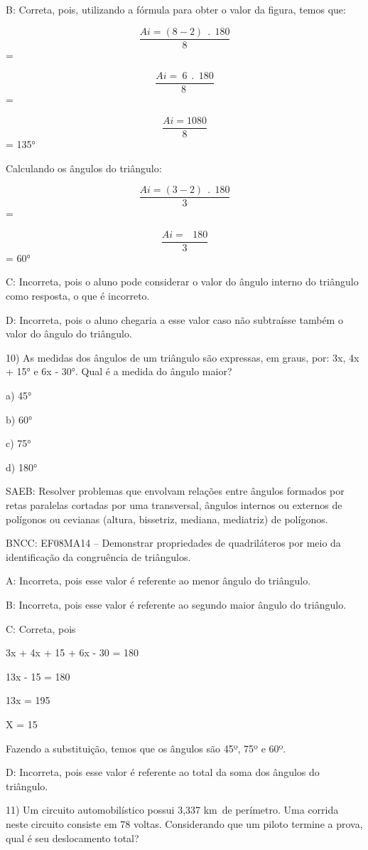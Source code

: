 B: Correta, pois, utilizando a fórmula para obter o valor da figura,
temos que:

\[\frac{Ai = \left( 8 - 2 \right)\ \ .\ \ 180}{8}\] =

\[\frac{Ai = \ 6\ \ .\ \ 180}{8\ }\] =

\[\frac{Ai = 1080}{8}\] = 135°

Calculando os ângulos do triângulo:

\[\frac{Ai = \left( 3 - 2 \right)\ \ .\ \ 180}{3}\] =

\[\frac{Ai = \ \ \ 180}{3}\] = 60°

C: Incorreta, pois o aluno pode considerar o valor do ângulo interno do
triângulo como resposta, o que é incorreto.

D: Incorreta, pois o aluno chegaria a esse valor caso não subtraísse
também o valor do ângulo do triângulo.

10) As medidas dos ângulos de um triângulo são expressas, em graus, por:
3x, 4x + 15° e 6x - 30°. Qual é a medida do ângulo maior?

a) 45°

b) 60°

c) 75°

d) 180°

SAEB: Resolver problemas que envolvam relações entre ângulos formados
por retas paralelas cortadas por uma transversal, ângulos internos ou
externos de polígonos ou cevianas (altura, bissetriz, mediana,
mediatriz) de polígonos.

BNCC: EF08MA14 -- Demonstrar propriedades de quadriláteros por meio da
identificação da congruência de triângulos.

A: Incorreta, pois esse valor é referente ao menor ângulo do triângulo.

B: Incorreta, pois esse valor é referente ao segundo maior ângulo do
triângulo.

C: Correta, pois

3x + 4x + 15 + 6x - 30 = 180

13x - 15 = 180

13x = 195

X = 15

Fazendo a substituição, temos que os ângulos são 45º, 75º e 60º.

D: Incorreta, pois esse valor é referente ao total da soma dos ângulos
do triângulo.

11) Um circuito automobilístico possui 3,337 km~de perímetro. Uma
corrida neste circuito consiste em 78 voltas. Considerando que um piloto
termine a prova, qual é seu deslocamento total?

